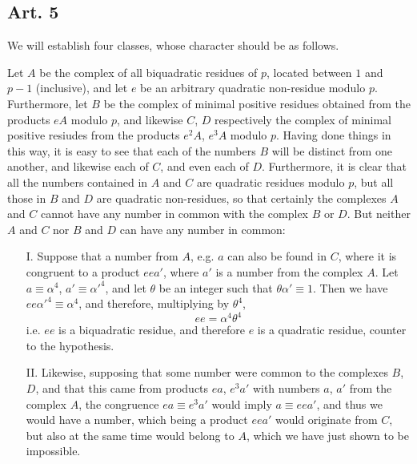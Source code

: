 \documentclass{book}
\theoremstyle{plain}
\theoremstyle{remark}
\begin{document}
\subsection*{Art. 5} 

We will establish four classes, whose character should be as follows.

Let $A$ be the complex of all biquadratic residues of $p$, located between $1$ and $p-1$ (inclusive), and let $e$ be an arbitrary quadratic non-residue modulo $p$.  Furthermore, let $B$ be the complex of minimal positive residues obtained from the products $eA$ modulo $p$, and likewise $C$, $D$ respectively the complex of minimal positive resiudes from the products $e^2A$, $e^3A$ modulo $p$.   Having done things in this way, it is easy to see that each of the numbers $B$ will be distinct from one another, and likewise each of $C$, and even each of $D$.  Furthermore, it is clear that all the numbers contained in $A$ and $C$ are quadratic residues modulo $p$, but all those in $B$ and $D$ are quadratic non-residues, so that certainly the complexes $A$ and $C$ cannot have any number in common with the complex $B$ or $D$.  But neither $A$ and $C$ nor $B$ and $D$ can have any number in common:
\begin{enumerate}
\item[I.] Suppose that a number from $A$, e.g. $a$ can also be found in $C$, where it is congruent to a product $eea'$, where $a'$ is a number from the complex $A$.  Let $a \equiv \alpha^4$, $a' \equiv \alpha'^4$, and let $\theta$ be an integer such that $\theta \alpha' \equiv 1$.  Then we have $ee\alpha'^4 \equiv \alpha^4$, and therefore, multiplying by $\theta^4$, 
\[ ee = \alpha^4 \theta^4 \]
i.e. $ee$ is a biquadratic residue, and therefore $e$ is a quadratic residue, counter to the hypothesis.
\item[II.] Likewise, supposing that some number were common to the complexes $B$, $D$, and that this came from products $ea$, $e^3a'$ with numbers $a$, $a'$ from the complex $A$, the congruence $ea \equiv e^3 a'$ would imply $a \equiv ee a'$, and thus we would have a number, which being a product $eea'$ would originate from $C$, but also at the same time would belong to $A$, which we have just shown to be impossible.
\end{enumerate}
\end{document}

